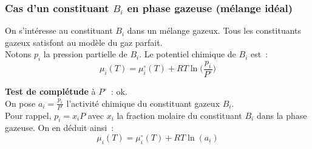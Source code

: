 \documentclass{article}
\begin{document}
\subsubsection{Cas d'un constituant $B_i$ en phase gazeuse (mélange idéal)}
\begin{tableau}
    \begin{enonce}
        On s'intéresse au constituant $B_i$ dans un mélange gazeux. Tous les constituants gazeux satisfont au modèle du gaz parfait.\\
    Notons $p_i$ la pression partielle de $B_i$. Le potentiel chimique de $B_i$ est~:
    $$\mu_i(T) = \mu_i^\circ(T) + RT\ln\bigg(\frac{p_i}{P^\circ}\bigg)$$
    \end{enonce}
    \textbf{Test de complétude} à $P^\circ$~: ok.\\
    On pose $a_i = \frac{p_i}{P^\circ}$ l'activité chimique du constituant gazeux $B_i$.\\
    Pour rappel, $p_i = x_iP$ avec $x_i$ la fraction molaire du constituant $B_i$ dans la phase gazeuse. On en déduit ainsi~:
    \begin{equation}\label{potphas}
        \mu_i(T) = \mu_i^\circ(T) + RT\ln(a_i)
    \end{equation}
\end{tableau}
\end{document}
